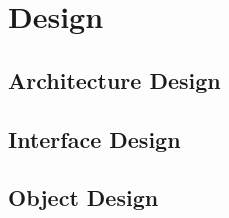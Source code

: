 \chapter{Design}

\section{Architecture Design}
\label{sec:architecture-design}

\section{Interface Design}
\label{sec:interface-design}

\section{Object Design}
\label{sec:object-design}